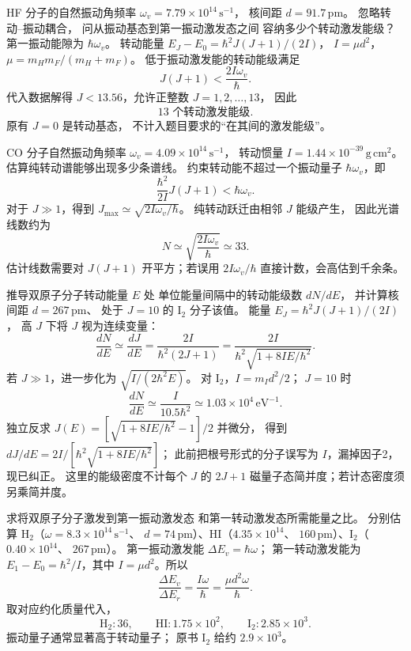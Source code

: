 HF 分子的自然振动角频率
$\omega_v=7.79\times10^{14}\,\mathrm{s^{-1}}$，
核间距 $d=91.7\,\mathrm{pm}$。
忽略转动--振动耦合，
问从振动基态到第一振动激发态之间
容纳多少个转动激发能级？
\exsolution
第一振动能隙为 $\hbar\omega_v$。
转动能量
$E_J-E_0=\hbar^2J(J+1)/(2I)$，
$I=\mu d^2$，$\mu=m_Hm_F/(m_H+m_F)$。
低于振动激发能的转动能级满足
\[
 J(J+1)<\frac{2I\omega_v}{\hbar}.
\]
代入数据解得
$J<13.56$，允许正整数 $J=1,2,\ldots,13$，
因此
\[
 \boxed{13\text{ 个转动激发能级}}.
\]
\excheck 原有 $J=0$ 是转动基态，
不计入题目要求的“在其间的激发能级”。

CO 分子自然振动角频率
$\omega_v=4.09\times10^{14}\,\mathrm{s^{-1}}$，
转动惯量 $I=1.44\times10^{-39}\,\mathrm{g\,cm^2}$。
估算纯转动谱能够出现多少条谱线。
\exsolution
约束转动能不超过一个振动量子
$\hbar\omega_v$，即
\[
 \frac{\hbar^2}{2I}J(J+1)<\hbar\omega_v.
\]
对于 $J\gg1$，得到
$J_{\max}\simeq\sqrt{2I\omega_v/\hbar}$。
纯转动跃迁由相邻 $J$ 能级产生，
因此光谱线数约为
\[
 \boxed{N\simeq\sqrt{\frac{2I\omega_v}{\hbar}}
 \simeq33}.
\]
\excheck 估计线数需要对
$J(J+1)$ 开平方；若误用 $2I\omega_v/\hbar$
直接计数，会高估到千余条。

推导双原子分子转动能量 $E$ 处
单位能量间隔中的转动能级数 $dN/dE$，
并计算核间距 $d=267\,\mathrm{pm}$、
处于 $J=10$ 的 $\mathrm{I_2}$ 分子该值。
\exsolution
能量 $E_J=\hbar^2J(J+1)/(2I)$，
高 $J$ 下将 $J$ 视为连续变量：
\[
 \frac{dN}{dE}\simeq\frac{dJ}{dE}
 =\frac{2I}{\hbar^2(2J+1)}
 =\frac{2I}{\hbar^2\sqrt{1+8IE/\hbar^2}}.
\]
若 $J\gg1$，进一步化为
$\sqrt{I/(2\hbar^2E)}$。
对 $\mathrm{I_2}$，$I=m_Id^2/2$；
$J=10$ 时
\[
 \boxed{\frac{dN}{dE}\simeq
 \frac{I}{10.5\hbar^2}
 \simeq1.03\times10^4\,\mathrm{eV^{-1}}}.
\]
\excheck 独立反求 $J(E)=[\sqrt{1+8IE/\hbar^2}-1]/2$ 并微分，
得到 $dJ/dE=2I/[\hbar^2\sqrt{1+8IE/\hbar^2}]$；
此前把根号形式的分子误写为 $I$，漏掉因子2，现已纠正。
这里的能级密度不计每个 $J$ 的
$2J+1$ 磁量子态简并度；若计态密度须另乘简并度。

求将双原子分子激发到第一振动激发态
和第一转动激发态所需能量之比。
分别估算 $\mathrm{H_2}$（$\omega=8.3\times10^{14}\,\mathrm{s^{-1}}$、
$d=74\,\mathrm{pm}$）、HI（$4.35\times10^{14}$、
$160\,\mathrm{pm}$）、$\mathrm{I_2}$（$0.40\times10^{14}$、
$267\,\mathrm{pm}$）。
\exsolution
第一振动激发能 $\Delta E_v=\hbar\omega$；
第一转动激发能为
$E_1-E_0=\hbar^2/I$，其中
$I=\mu d^2$。所以
\[
 \boxed{\frac{\Delta E_v}{\Delta E_r}
 =\frac{I\omega}{\hbar}
 =\frac{\mu d^2\omega}{\hbar}}.
\]
取对应约化质量代入，
\[
 \boxed{\mathrm{H_2}:36,\qquad
 \mathrm{HI}:1.75\times10^2,\qquad
 \mathrm{I_2}:2.85\times10^3}.
\]
\excheck 振动量子通常显著高于转动量子；
原书 $\mathrm{I_2}$ 给约 $2.9\times10^3$。

